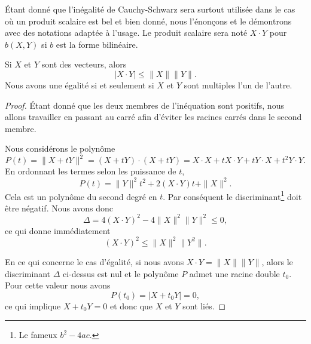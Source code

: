 Étant donné que l'inégalité de Cauchy-Schwarz sera surtout utilisée dans le cas où un produit scalaire est bel et bien donné, nous l'énonçons et le démontrons avec des notations adaptée à l'usage. Le produit scalaire sera noté \( X\cdot Y\) pour \( b(X,Y)\) si \( b\) est la forme bilinéaire.
\begin{theorem}      \label{ThoAYfEHG}
	Si $X$ et $Y$ sont des vecteurs, alors
    \begin{equation}        \label{EQooZDSHooWPcryG}
		| X\cdot Y |\leq\| X \|\| Y \|.
	\end{equation}
    Nous avons une égalité si et seulement si \( X\) et \( Y\) sont multiples l'un de l'autre.
\end{theorem}

\begin{proof}
	Étant donné que les deux membres de l'inéquation sont positifs, nous allons travailler en passant au carré afin d'éviter les racines carrés dans le second membre.

	Nous considérons le polynôme
	\begin{equation}
		P(t)=\| X+tY \|^2=(X+tY)\cdot(X+tY)=X\cdot X+tX\cdot Y+tY\cdot X+t^2Y\cdot Y.
	\end{equation}
	En ordonnant les termes selon les puissance de $t$,
	\begin{equation}
		P(t)=\| Y \|^2t^2+2(X\cdot Y)t+\| X \|^2.
	\end{equation}
	Cela est un polynôme du second degré en $t$. Par conséquent le discriminant\footnote{Le fameux $b^2-4ac$.} doit être négatif. Nous avons donc
	\begin{equation}
		\Delta=4(X\cdot Y)^2-4\| X \|^2\| Y \|^2\leq 0,
	\end{equation}
	ce qui donne immédiatement
	\begin{equation}
		(X\cdot Y)^2\leq\| X \|^2\| Y^2 \|.
	\end{equation}

    En ce qui concerne le cas d'égalité, si nous avons \( X\cdot Y=\| X \|\| Y \|\), alors le discriminant \( \Delta\) ci-dessus est nul et le polynôme \( P\) admet une racine double \( t_0\). Pour cette valeur nous avons
    \begin{equation}
        P(t_0)=| X+t_0Y |=0,
    \end{equation}
    ce qui implique \( X+t_0Y=0\) et donc que \( X\) et \( Y\) sont liés.
\end{proof}

